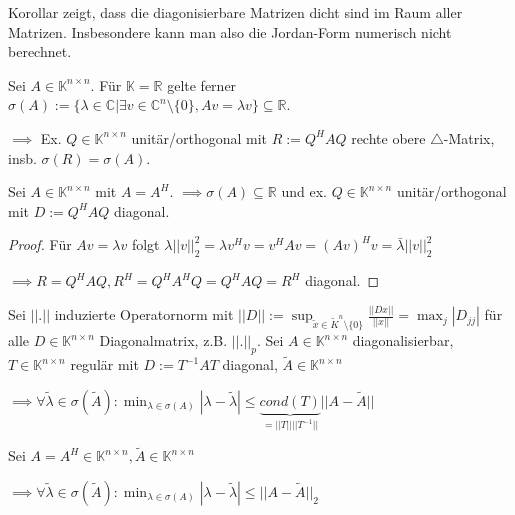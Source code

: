 \begin{remark}
	Korollar zeigt, dass die diagonisierbare Matrizen dicht sind im Raum aller Matrizen. Insbesondere kann man also die Jordan-Form numerisch nicht berechnet.
\end{remark}

\begin{theorem}
	Sei $A \in \mathbb{K}^{n\times n}$. Für $\mathbb{K} = \mathbb{R}$ gelte ferner $\sigma(A) := \{\lambda \in \mathbb{C}| \exists v \in \mathbb{C}^n\setminus\{0\}, Av=\lambda v\} \subseteq \mathbb{R}$.
	
	$\implies$ Ex. $Q \in \mathbb{K}^{n\times n}$ unitär/orthogonal mit $R := Q^HAQ$ rechte obere $\triangle$-Matrix, insb. $\sigma(R) = \sigma(A)$.
\end{theorem}

\begin{corollary}[Spektralzerlegung]
	Sei $A \in \mathbb{K}^{n\times n}$ mit $A=A^H$. $\implies \sigma(A) \subseteq \mathbb{R}$ und ex. $Q \in \mathbb{K}^{n\times n}$ unitär/orthogonal mit $D:=Q^H A Q$ diagonal.
\end{corollary}

\begin{proof}
	Für $Av = \lambda v$ folgt $\lambda ||v||_2^2 = \lambda v^Hv = v^HAv = (Av)^Hv = \bar{\lambda} ||v||_2^2$
	
	$\implies R=Q^HAQ, R^H = Q^HA^HQ = Q^HAQ=R^H$ diagonal.
\end{proof}

\begin{theorem}
	Sei $||.||$ induzierte Operatornorm mit $||D|| := \sup_{\tilde{x} \in \tilde{K}^n\setminus\{0\}} \frac{||Dx||}{||x||} = \max_j |D_{jj}|$ für alle $D \in \mathbb{K}^{n\times n}$ Diagonalmatrix, z.B. $||.||_p$. Sei $A \in \mathbb{K}^{n\times n}$ diagonalisierbar, $T \in \mathbb{K}^{n\times n}$ regulär mit $D:=T^{-1}AT$ diagonal, $\tilde{A} \in \mathbb{K}^{n\times n}$
	
	$\implies \forall \tilde{\lambda} \in \sigma(\tilde{A}): \min_{\lambda\in\sigma(A)} |\lambda - \tilde{\lambda}| \leq \underbrace{cond(T)}_{= ||T|| ||T^{-1}||} ||A-\tilde{A}||$
\end{theorem}

\begin{corollary}
	Sei $A=A^H \in \mathbb{K}^{n\times n}, \tilde{A} \in \mathbb{K}^{n\times n}$
	
	$\implies \forall \tilde{\lambda} \in \sigma(\tilde{A}): \min_{\lambda \in \sigma(A)} |\lambda - \tilde{\lambda}| \leq ||A - \tilde{A}||_2$
\end{corollary}

